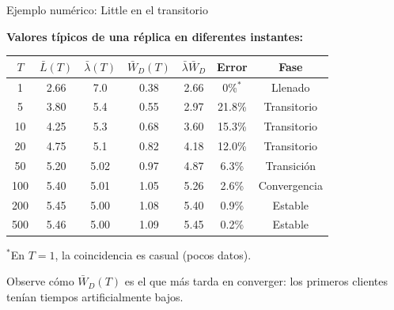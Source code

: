 \documentclass[aspectratio=1610, 9pt]{beamer}
\begin{document}
\begin{frame}{Ejemplo numérico: Little en el transitorio}

\textbf{Valores típicos de una réplica en diferentes instantes:}

\vspace{0.3cm}
\begin{center}
\renewcommand{\arraystretch}{1.4}
\small
\begin{tabular}{ccccccc}
\toprule
$T$ & $\bar{L}(T)$ & $\bar{\lambda}(T)$ & $\bar{W}_D(T)$ & $\bar{\lambda}\bar{W}_D$ & \textbf{Error} & \textbf{Fase} \\
\midrule
1 & 2.66 & 7.0 & 0.38 & 2.66 & 0\%$^*$ & Llenado \\
5 & 3.80 & 5.4 & 0.55 & 2.97 & 21.8\% & Transitorio \\
10 & 4.25 & 5.3 & 0.68 & 3.60 & 15.3\% & Transitorio \\
20 & 4.75 & 5.1 & 0.82 & 4.18 & 12.0\% & Transitorio \\
50 & 5.20 & 5.02 & 0.97 & 4.87 & 6.3\% & Transición \\
100 & 5.40 & 5.01 & 1.05 & 5.26 & 2.6\% & Convergencia \\
200 & 5.45 & 5.00 & 1.08 & 5.40 & 0.9\% & Estable \\
500 & 5.46 & 5.00 & 1.09 & 5.45 & 0.2\% & Estable \\
\bottomrule
\end{tabular}
\end{center}

\small $^*$En $T=1$, la coincidencia es casual (pocos datos).

\vspace{0.2cm}
\normalsize
Observe cómo $\bar{W}_D(T)$ es el que más tarda en converger: los primeros clientes tenían tiempos artificialmente bajos.
\end{frame}
\end{document}
